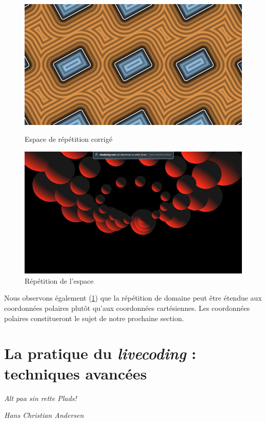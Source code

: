 \begin{figure}[h]
  \begin{minipage}[b]{0.45\linewidth}
    \centering
    \includegraphics[width=\linewidth]{images/sdf/repet05.png}
    \caption{Espace de répétition corrigé}
    \label{repet05}
  \end{minipage}
  \hspace{0.1\linewidth} %
  \begin{minipage}[b]{0.45\linewidth}
    \centering
    \includegraphics[width=\linewidth]{images/shaders/shaderatelier_05.jpg}
    \caption{Répétition de l'espace}
    \label{shadat05}
  \end{minipage}
\end{figure}

Nous observons également (\ref{shadat05}) que la répétition de domaine peut être étendue aux coordonnées polaires plutôt qu'aux coordonnées cartésiennes. Les coordonnées polaires constitueront le sujet de notre prochaine section.

\chapter{La pratique du \textit{livecoding} : techniques avancées}
\setlength{\epigraphwidth}{0.2\linewidth} %
\epigraph{\textit{Alt paa sin rette Plads!}}{\textit{Hans Christian Andersen}}

